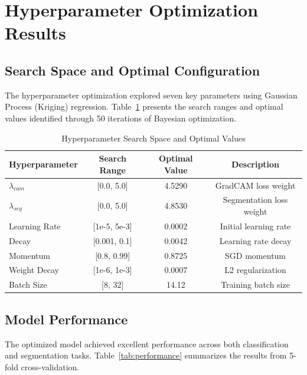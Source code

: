 
\section{Hyperparameter Optimization Results}

\subsection{Search Space and Optimal Configuration}

The hyperparameter optimization explored seven key parameters using Gaussian Process (Kriging) regression. Table~\ref{tab:hyperparams} presents the search ranges and optimal values identified through 50 iterations of Bayesian optimization.

\begin{table}[h]
\centering
\caption{Hyperparameter Search Space and Optimal Values}
\label{tab:hyperparams}
\begin{tabular}{@{}lccc@{}}
\toprule
\textbf{Hyperparameter} & \textbf{Search Range} & \textbf{Optimal Value} & \textbf{Description} \\
\midrule
$\lambda_{cam}$ & [0.0, 5.0] & 4.5290 & GradCAM loss weight \\
$\lambda_{seg}$ & [0.0, 5.0] & 4.8530 & Segmentation loss weight \\
Learning Rate & [1e-5, 5e-3] & 0.0002 & Initial learning rate \\
Decay & [0.001, 0.1] & 0.0042 & Learning rate decay \\
Momentum & [0.8, 0.99] & 0.8725 & SGD momentum \\
Weight Decay & [1e-6, 1e-3] & 0.0007 & L2 regularization \\
Batch Size & [8, 32] & 14.12 & Training batch size \\
\bottomrule
\end{tabular}
\end{table}

\subsection{Model Performance}

The optimized model achieved excellent performance across both classification and segmentation tasks. Table~\ref{tab:performance} summarizes the results from 5-fold cross-validation.

